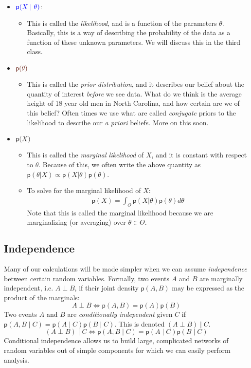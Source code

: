 \documentclass[twoside]{article}
\def\indep{\perp} %
\def\p{\textsf{p}} %
\begin{document}
\begin{itemize}
 \item ${\color{blue} \p(X \mid \theta )}$:
 \begin{itemize}
 \item This is called the \emph{likelihood}, and is a function of the parameters $\theta$. Basically, this is a way of describing the probability 
  of the data as a function of these unknown parameters. We will discuss this in the third class. 
 \end{itemize}
 \item ${\color{Sepia} \p( \theta )}$ 
 \begin{itemize}
 \item This is called the \emph{prior distribution}, and it describes our belief about the quantity of interest \emph{before} we see data. What do we  think is the average height of 18 year old men in North Carolina, and how certain are we of this belief? Often times we use what are called \emph{conjugate} priors to the likelihood to describe our \emph{a priori} beliefs. More on this soon.
 \end{itemize}
 \item ${\color{Black} \p(X)}$ 
 \begin{itemize}
 \item This is called the \emph{marginal likelihood} of $X$, and it is constant with respect to $\theta$. Because of this, we often write the  above quantity as $ { \p(\theta | X ) } \propto { \p(X | \theta )}{\p( \theta )}$.
 \item To solve for the marginal likelihood of $X$:
 \begin{align}
  \p(X) = \int_{\Theta} \p(X|\theta) \p(\theta) d\theta 
 \end{align}
  Note that this is called the marginal likelihood because we are marginalizing (or averaging) over $\theta \in \Theta$. 
 \end{itemize}

\end{itemize}

\subsection{Independence} 
Many of our calculations will be made simpler when we can assume \emph{independence} between certain random variables. Formally, two events $A$ and $B$ are marginally independent, i.e. $A \indep B$, if their joint density $\p(A,B)$ may be expressed as the product of the marginals:
$$ A\indep B \iff \p(A,B)  = \p(A) \p(B) $$
Two events $A$ and $B$ are \emph{conditionally independent} given $C$ if $\p(A,B \mid C) = \p(A \mid C)\p(B\mid C)$. This is denoted $\left( A \indep B \right)\mid  C$. 
$$ \left( A \indep B \right)\mid  C \iff \p(A,B\mid C) = \p(A\mid C)\p(B\mid C) $$
Conditional independence allows us to build large, complicated networks of random variables out of simple components for which we can easily perform analysis.
\end{document}
